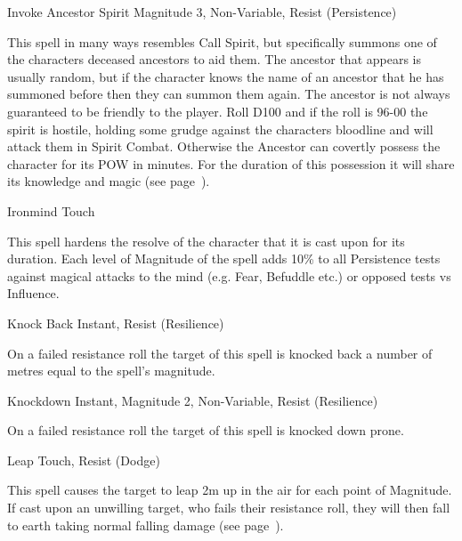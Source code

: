 \begin{rpg-spell}
{Invoke Ancestor Spirit}
{Magnitude 3, Non-Variable, Resist (Persistence)}

This spell in many ways resembles Call Spirit, but specifically summons one of the characters deceased ancestors to aid them. The ancestor that appears is usually random, but if the character knows the name of an ancestor that he has summoned before then they can summon them again. The ancestor is not always guaranteed to be friendly to the player. Roll D100 and if the roll is 96-00 the spirit is hostile, holding some grudge against the characters bloodline and will attack them in Spirit Combat. Otherwise the Ancestor can covertly possess the character for its POW in minutes. For the duration of this possession it will share its knowledge and magic (see page~\pageref{sec:spirits}).
\end{rpg-spell}


\begin{rpg-spell}
{Ironmind}
{Touch}

This spell hardens the resolve of the character that it is cast upon for its duration. Each level of Magnitude of the spell adds 10\% to all Persistence tests against magical attacks to the mind (e.g. Fear, Befuddle etc.) or opposed tests vs Influence.
\end{rpg-spell}


\begin{rpg-spell}
{Knock Back}
{Instant, Resist (Resilience)}

On a failed resistance roll the target of this spell is knocked back a number of metres equal to the spell’s magnitude.
\end{rpg-spell}


\begin{rpg-spell}
{Knockdown}
{Instant, Magnitude 2, Non-Variable, Resist (Resilience)}

On a failed resistance roll the target of this spell is knocked down prone.
\end{rpg-spell}


\begin{rpg-spell}
{Leap}
{Touch, Resist (Dodge)}

This spell causes the target to leap 2m up in the air for each point of Magnitude. If cast upon an unwilling target, who fails their resistance roll, they will then fall to earth taking normal falling damage (see page~\pageref{ssec:falling}).
\end{rpg-spell}


